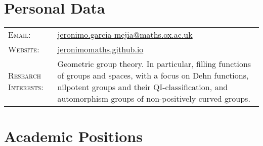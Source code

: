 \documentclass[a4paper,11pt]{article} %
\begin{document}
\pagestyle{empty} %


\par{\bigskip\par} %

\section{Personal Data}

\begin{longtable}{>{\raggedleft\arraybackslash}p{4cm}p{10cm}}
\textsc{Email:} & \href{mailto:jeronimo.garcia-mejia@maths.ox.ac.uk}{jeronimo.garcia-mejia@maths.ox.ac.uk}\\
\textsc{Website:} & \href{https://jeronimomaths.github.io}{jeronimomaths.github.io} \\
\textsc{Research Interests:} & Geometric group theory. In particular, filling functions of groups and spaces, with a focus on Dehn functions, nilpotent groups and their QI-classification, and automorphism groups of non-positively curved groups.\end{longtable}

\section{Academic Positions}

\end{document}
